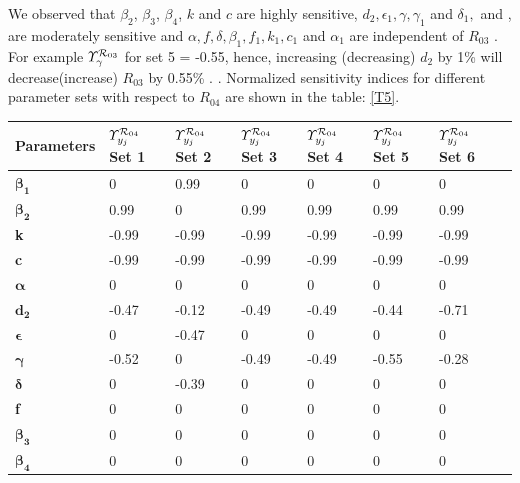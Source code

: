 \noindent We observed that $\beta_{2}$, $\beta_{3}$, $\beta_{4}$, $k$ and $c$ are highly sensitive, $d_{2}, \epsilon_{1}, \gamma, \gamma_{1}$ and $\delta_{1},$ and , are moderately sensitive and $\alpha, f,
\delta, \beta_{1}, f_{1}, k_{1}, c_{1}$ and $\alpha_{1}$ are independent of $R_{03}$ . For example $\varUpsilon^{{{\cal R}}_{03}}_{\gamma}$ for set 5 = -0.55, hence, increasing (decreasing) $d_{2}$ by 1\% will decrease(increase) $R_{03}$ by 0.55\% .
\newpage
{}. Normalized sensitivity indices for different parameter sets with respect to $R_{04}$ are shown in the table: \ref{T5}.\\
\begin{table}
\centering
    \begin{tabular}{|p{3cm}|p{1.6cm}|p{1.6cm}|p{1.6cm}|p{1.6cm}|p{1.6cm}|p{1.6cm}|p{1.6cm}|}
    \hline
               Parameters      & \textbf{$\varUpsilon^{{{\cal R}}_{04}}_{y_j}$ Set 1} & \textbf{$\varUpsilon^{{{\cal R}}_{04}}_{y_j}$ Set 2} & \textbf{$\varUpsilon^{{{\cal R}}_{04}}_{y_j}$ Set 3} & \textbf{$\varUpsilon^{{{\cal R}}_{04}}_{y_j}$ Set 4} & \textbf{$\varUpsilon^{{{\cal R}}_{04}}_{y_j}$ Set 5} & \textbf{$\varUpsilon^{{{\cal R}}_{04}}_{y_j}$ Set 6} \\
            \hline
  $\boldsymbol {\beta_{1}} $                 & 0 & 0.99 & 0 & 0 & 0 & 0  \\
  $\boldsymbol {\beta_{2}} $      & 0.99 & 0 & 0.99 & 0.99 & 0.99 & 0.99 \\
  \textbf {k}       & -0.99 & -0.99 & -0.99 & -0.99 & -0.99 & -0.99  \\
  \textbf{c}               & -0.99 & -0.99 & -0.99 & -0.99 & -0.99 & -0.99  \\
  $\boldsymbol{\alpha}$          & 0 & 0 & 0 & 0 & 0 & 0  \\
  $\mathbf {d _{2} }$           & -0.47 & -0.12 & -0.49 & -0.49 & -0.44 & -0.71  \\
  $\boldsymbol{\epsilon}$          & 0 & -0.47 & 0 & 0 & 0 & 0  \\
  $\boldsymbol{\gamma}$                & -0.52 & 0 & -0.49 & -0.49 & -0.55 & -0.28  \\
  $\boldsymbol{\delta}$        & 0 & -0.39 & 0 & 0 & 0 & 0  \\
  \textbf{f}           & 0 & 0 & 0 & 0 & 0 & 0  \\
  $\boldsymbol {\beta_{3}}$          & 0 & 0 & 0 & 0 & 0 & 0  \\
  $\boldsymbol {\beta_{4}}$             & 0 & 0 & 0 & 0 & 0 & 0  \\

\end{tabular}
\end{table}
